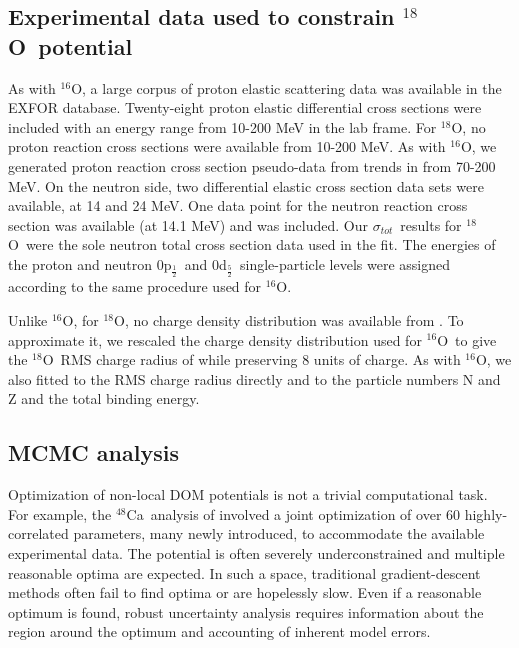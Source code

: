 \documentclass[twocolumn,secnumarabic,amssymb, nobibnotes, aps, prl,
superscriptaddress, nobalancelastpage]{revtex4}
\newcommand{\tot}{\ensuremath{\sigma_{tot}}}
\newcommand{\oSix}{\ensuremath{^{16}}O}
\newcommand{\oEight}{\ensuremath{^{18}}O}
\newcommand{\caEight}{\ensuremath{^{48}}C\lowercase{a}}
\newcommand{\pOne}{p\ensuremath{_{\frac{1}{2}}}}
\newcommand{\dFive}{d\ensuremath{_{\frac{5}{2}}}}
\begin{document}
\subsection{Experimental data used to constrain \oEight\ potential}
As with \oSix, a large corpus of proton elastic scattering data was
available in the EXFOR database. Twenty-eight proton elastic differential cross
sections were included with an energy range from 10-200 MeV in the lab frame.
For \oEight, no proton reaction cross sections were available from 10-200 MeV.
As with \oSix, we generated proton reaction cross section pseudo-data from
trends in \cite{Carlson1975} from 70-200 MeV. On the neutron side, two
differential elastic cross section data sets were available, at 14 and 24 MeV.
One data point for the neutron reaction cross section was available
(at 14.1 MeV) and was included. Our \tot\ results for \oEight\ were the
sole neutron total cross section data used in the fit. The energies of the
proton and neutron 0\pOne\ and 0\dFive\ single-particle
levels were assigned according to the same procedure used for \oSix.

Unlike \oSix, for \oEight, no charge density distribution was available from
\cite{DeVries1987}. To approximate it, we rescaled the charge density
distribution used for \oSix\ to give the \oEight\ RMS charge radius of
\cite{Angeli2013} while preserving 8 units of charge.
As with \oSix, we also fitted to the
RMS charge radius directly and to the particle numbers N and Z and the
total binding energy.

\subsection{MCMC analysis}
Optimization of non-local DOM potentials is not a trivial computational task.
For example, the \caEight\ analysis of \cite{Mahzoon2017} involved a joint
optimization of over 60 highly-correlated parameters, many newly introduced, to
accommodate the available experimental data. The potential is
often severely underconstrained and multiple reasonable optima are expected.
In such a space, traditional gradient-descent methods often fail to find optima
or are hopelessly slow. Even if a reasonable optimum is found, robust
uncertainty analysis requires information about the region around the optimum and
accounting of inherent model errors.
\end{document}
